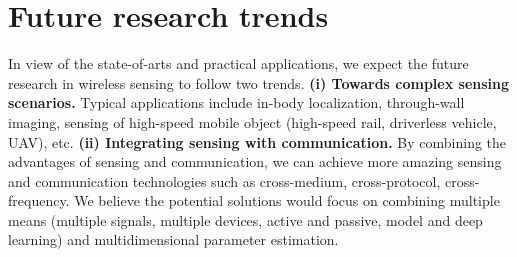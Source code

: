 \section{Future research trends}

In view of the state-of-arts and practical applications, we expect the future research in wireless sensing to follow two trends. \textbf{(i) Towards complex sensing scenarios.} Typical applications include in-body localization, through-wall imaging, sensing of high-speed mobile object (high-speed rail, driverless vehicle, UAV), etc. \textbf{(ii) Integrating sensing with communication.} By combining the advantages of sensing and communication, we can achieve more amazing sensing and communication technologies such as cross-medium, cross-protocol, cross-frequency.
We believe the potential solutions would focus on combining multiple means (multiple signals, multiple devices, active and passive, model and deep learning) and multidimensional parameter estimation.
